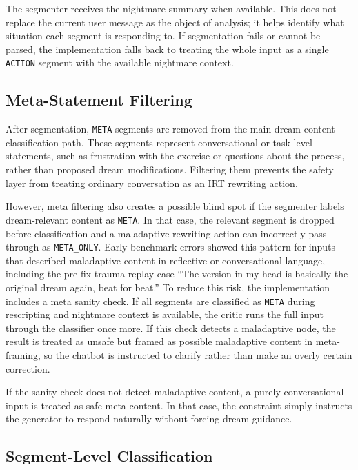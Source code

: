 The segmenter receives the nightmare summary when available. This does not replace the current user message as the object of analysis; it helps identify what situation each segment is responding to. If segmentation fails or cannot be parsed, the implementation falls back to treating the whole input as a single \texttt{ACTION} segment with the available nightmare context.

\subsection{Meta-Statement Filtering}

After segmentation, \texttt{META} segments are removed from the main dream-content classification path. These segments represent conversational or task-level statements, such as frustration with the exercise or questions about the process, rather than proposed dream modifications. Filtering them prevents the safety layer from treating ordinary conversation as an IRT rewriting action.

However, meta filtering also creates a possible blind spot if the segmenter labels dream-relevant content as \texttt{META}. In that case, the relevant segment is dropped before classification and a maladaptive rewriting action can incorrectly pass through as \texttt{META\_ONLY}. Early benchmark errors showed this pattern for inputs that described maladaptive content in reflective or conversational language, including the pre-fix trauma-replay case ``The version in my head is basically the original dream again, beat for beat.'' To reduce this risk, the implementation includes a meta sanity check. If all segments are classified as \texttt{META} during rescripting and nightmare context is available, the critic runs the full input through the classifier once more. If this check detects a maladaptive node, the result is treated as unsafe but framed as possible maladaptive content in meta-framing, so the chatbot is instructed to clarify rather than make an overly certain correction.

If the sanity check does not detect maladaptive content, a purely conversational input is treated as safe meta content. In that case, the constraint simply instructs the generator to respond naturally without forcing dream guidance.

\subsection{Segment-Level Classification}

